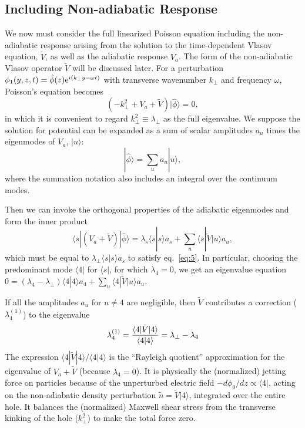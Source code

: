 \documentclass[12pt]{article}
\def\ket#1{|#1\rangle}
\def\bra#1{\langle#1}
\begin{document}
\subsection{Including Non-adiabatic Response}
We now must consider the full linearized Poisson equation including the
non-adiabatic response arising from the solution to the time-dependent
Vlasov equation, $\tilde{V}$, as well as the adiabatic response
$V_a$. The form of the non-adiabatic Vlasov operator $\tilde{V}$ will
be discussed later. For a perturbation
$\phi_1(y,z,t)=\hat\phi(z){\rm e}^{i(k_\perp y-\omega t)}$ with
transverse wavenumber $k_\perp$ and frequency $\omega$, Poisson's
equation becomes
\begin{equation}
  \label{eq:5}
  (-k_\perp^2+V_a+\tilde{V})\ket{\hat\phi}=0,
\end{equation}
in which it is convenient to regard $k_\perp^2\equiv\lambda_\perp$ as
the full eigenvalue.  We suppose the solution for potential can be
expanded as a sum of scalar amplitudes $a_u$ times the eigenmodes of
$V_a$, $\ket{u}$:
\begin{equation}
  \label{eq:6}
  \ket{\hat\phi}=\sum_u a_u \ket{u},
\end{equation}
where the summation notation also includes an integral over the
continuum modes.

Then we can invoke the orthogonal properties of the
adiabatic eigenmodes and form the inner product
\begin{equation}
  \label{eq:7}
  \bra{s}|(%
  V_a+\tilde{V})\ket{\hat\phi}
  = %
  \lambda_s\bra{s}\ket{s}a_s+\sum_u\bra{s}|\tilde{V}\ket{u}a_u,
\end{equation}
which must be equal to $\lambda_\perp\bra{s}\ket{s}a_s$ to satisfy eq.\ \ref{eq:5}.
In particular, choosing the predominant mode $\bra{4}|$ for
$\bra{s}|$, for which $\lambda_4=0$, we get an eigenvalue equation
$0=(\lambda_4-\lambda_\perp)\bra{4}\ket{4}a_4+\sum_u\bra{4}|\tilde{V}\ket{u}a_u$.

If all the amplitudes $a_u$ for $u\not=4$ are negligible, then
$\tilde{V}$ contributes a correction ($\lambda_{4}^{(1)}$) to the eigenvalue
\begin{equation}
  \label{eq:8}
  \lambda_{4}^{(1)}= {\bra{4}|\tilde{V}\ket{4}\over\bra{4}\ket{4}}=\lambda_\perp-\lambda_4
\end{equation}
The expression $\bra{4}|\tilde{V}\ket{4}/\bra{4}\ket{4}$ is the ``Rayleigh
quotient'' approximation for the eigenvalue of $V_a+\tilde{V}$
(because $\lambda_4=0$). It is
physically the (normalized) jetting force on particles because of the
unperturbed electric field $-d\phi_0/dz\propto\bra{4}|$, acting on the
non-adiabatic density perturbation $\tilde n = \tilde{V}\ket{4}$, integrated
over the entire hole. It balances the (normalized) Maxwell shear
stress from the transverse kinking of the hole ($k_\perp^2$) to
make the total force zero.
\end{document}
